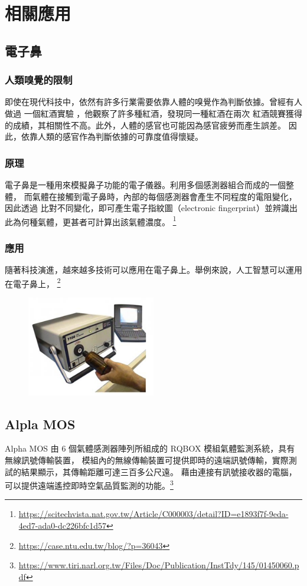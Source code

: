 \chapter{相關應用}

\section{電子鼻}
\subsection{人類嗅覺的限制}
即使在現代科技中，依然有許多行業需要依靠人體的嗅覺作為判斷依據。曾經有人做過
一個紅酒實驗 \cite{hodgson_2008} ，他觀察了許多種紅酒，發現同一種紅酒在兩次
紅酒競賽獲得的成績，其相關性不高。此外，人體的感官也可能因為感官疲勞而產生誤差。
因此，依靠人類的感官作為判斷依據的可靠度值得懷疑。
\subsection{原理}
電子鼻是一種用來模擬鼻子功能的電子儀器。利用多個感測器組合而成的一個整體，
而氣體在接觸到電子鼻時，內部的每個感測器會產生不同程度的電阻變化，因此透過
比對不同變化，即可產生電子指紋圖（electronic fingerprint）並辨識出
此為何種氣體，更甚者可計算出該氣體濃度。 \footnote{\url{https://scitechvista.nat.gov.tw/Article/C000003/detail?ID=e1893f7f-9eda-4ed7-ada0-dc226bfc1d57}}
\subsection{應用}
隨著科技演進，越來越多技術可以應用在電子鼻上。舉例來說，人工智慧可以運用
在電子鼻上， \footnote{\url{https://case.ntu.edu.tw/blog/?p=36043}}
\begin{figure}[H]
	\centering
	\includegraphics[width=0.5\textwidth]{../../pic/nose.png}
\end{figure}

\section{Alpla MOS}
Alpha MOS 由 6 個氣體感測器陣列所組成的 RQBOX 模組氣體監測系統，具有無線訊號傳輸裝置，
模組內的無線傳輸裝置可提供即時的遠端訊號傳輸，實際測試的結果顯示，其傳輸距離可達三百多公尺遠。
藉由連接有訊號接收器的電腦，可以提供遠端遙控即時空氣品質監測的功能。\footnote{\url{https://www.tiri.narl.org.tw/Files/Doc/Publication/InstTdy/145/01450060.pdf}}

